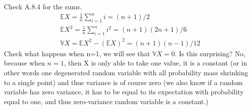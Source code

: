 
\setcounter{theorem}{4}
\begin{exercise} [BH.4.5]
\begin{solution}
    Check A.8.4 for the sums. 
	\begin{align*}
		&\mathbb{E}X=\frac{1}{n}\sum_{i=1}^{n} i= (n+1)/2\\
		&\mathbb{E}X^2=\frac{1}{n}\sum_{i=1}^{n}i^2 = (n+1)(2n+1)/6 \\
		&\mathbb{V}X= \mathbb{E}X^2 -(\mathbb{E}X)^2 =  (n+1)(n-1)/12
	\end{align*}
	Check what happens when n=1, we will see that $\mathbb{V}X=0$. Is this surprising? No, because when $n=1$, then X is only able to take one value, it is a constant (or in other words one degenerated random variable with all probability mass shrinking to a single point) and thus variance is of course zero (we also know if a random variable has zero variance, it has to be equal to its expectation with probability equal to one, and thus zero-variance random variable is a constant.)
\end{solution}
\end{exercise}

